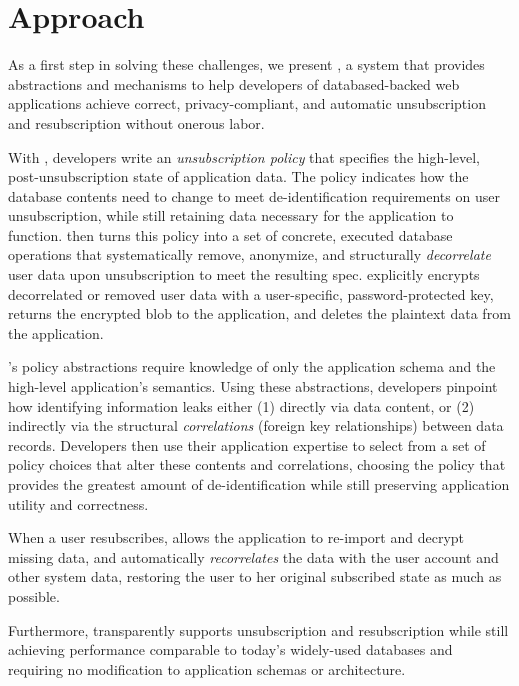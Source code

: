 \section{Approach}
As a first step in solving these challenges, we present \sys, a system that provides abstractions
and mechanisms to help developers of databased-backed web applications achieve correct,
privacy-compliant, and automatic unsubscription and resubscription without onerous labor.

With \sys, developers write an \emph{unsubscription policy} that specifies the high-level,
post-unsubscription state of application data.  The policy indicates how the database contents need
to change to meet de-identification requirements on user unsubscription, while still retaining data
necessary for the application to function. \sys then turns this policy into a set of concrete,
executed database operations that systematically remove, anonymize, and structurally
\emph{decorrelate} user data upon unsubscription to meet the resulting spec. \sys explicitly
encrypts decorrelated or removed user data with a user-specific, password-protected key, returns the
encrypted blob to the application, and deletes the plaintext data from the application.


\sys's policy abstractions require knowledge of only the application schema and the high-level
application's semantics. Using these abstractions, developers pinpoint how identifying information
leaks either (1) directly via data content, or (2) indirectly via the structural \emph{correlations}
(foreign key relationships) between data records. Developers then use their application expertise to
select from a set of policy choices that alter these contents and correlations, choosing the policy
that provides the greatest amount of de-identification while still preserving application
utility and correctness.

When a user resubscribes, \sys allows the application to re-import and decrypt missing data, and automatically
\emph{recorrelates} the data with the user account and other system data, restoring the user to her
original subscribed state as much as possible.

Furthermore, \sys transparently supports unsubscription and resubscription while still achieving performance
comparable to today’s widely-used databases and requiring no modification to application schemas or
architecture.

